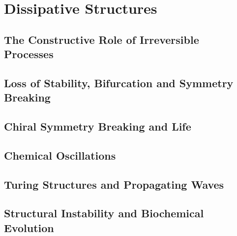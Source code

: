 \chapter{Dissipative Structures}
\section{The Constructive Role of Irreversible Processes}
\section{Loss of Stability, Bifurcation and Symmetry Breaking}
\section{Chiral Symmetry Breaking and Life}
\section{Chemical Oscillations}
\section{Turing Structures and Propagating Waves}
\section{Structural Instability and Biochemical Evolution}